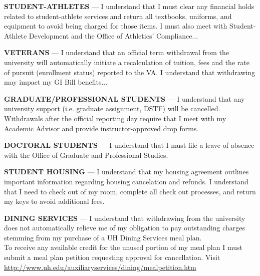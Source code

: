 \documentclass[12pt]{article}
\begin{document}
\noindent\underline{\hspace{1.5em}} \textbf{STUDENT-ATHLETES} — I understand that I must clear any financial holds related to student-athlete services and return all textbooks, uniforms, and equipment to avoid being charged for those items. I must also meet with Student-Athlete Development and the Office of Athletics’ Compliance...
\vspace{1em}

\noindent\underline{\hspace{1.5em}} \textbf{VETERANS} — I understand that an official term withdrawal from the university will automatically initiate a recalculation of tuition, fees and the rate of pursuit (enrollment status) reported to the VA. I understand that withdrawing may impact my GI Bill benefits...
\vspace{1em}

\noindent\underline{\hspace{1.5em}} \textbf{GRADUATE/PROFESSIONAL STUDENTS} — I understand that any university support (i.e. graduate assignment, DSTF) will be cancelled. Withdrawals after the official reporting day require that I meet with my Academic Advisor and provide instructor-approved drop forms.
\vspace{1em}

\noindent\underline{\hspace{1.5em}} \textbf{DOCTORAL STUDENTS} — I understand that I must file a leave of absence with the Office of Graduate and Professional Studies.
\vspace{1em}

\noindent\underline{\hspace{1.5em}} \textbf{STUDENT HOUSING} — I understand that my housing agreement outlines important information regarding housing cancelation and refunds. I understand that I need to check out of my room, complete all check out processes, and return my keys to avoid additional fees.
\vspace{1em}

\noindent\underline{\hspace{1.5em}} \textbf{DINING SERVICES} — I understand that withdrawing from the university does not automatically relieve me of my obligation to pay outstanding charges stemming from my purchase of a UH Dining Services meal plan. \\
To receive any available credit for the unused portion of my meal plan I must submit a meal plan petition requesting approval for cancellation. Visit \url{http://www.uh.edu/auxiliaryservices/dining/mealpetition.htm}
\vspace{1em}
\end{document}
